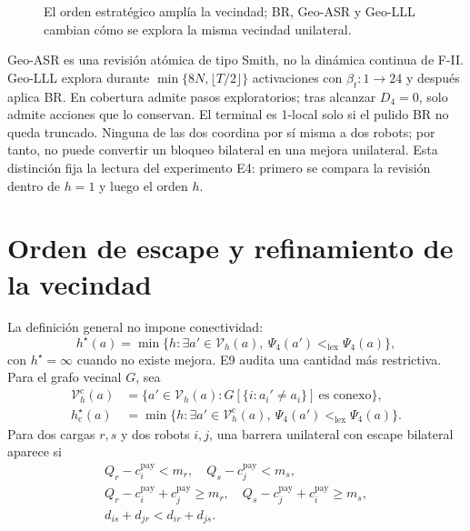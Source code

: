 \begin{figure}[H]
\centering

\caption{El orden estratégico amplía la vecindad; BR, Geo-ASR y Geo-LLL
cambian cómo se explora la misma vecindad unilateral.}
\label{fig:n4-order-revision}
\viuownsource
\end{figure}

Geo-ASR es una revisión atómica de tipo Smith, no la dinámica continua de F-II.
Geo-LLL explora durante $\min\{8N,\lfloor T/2\rfloor\}$ activaciones con
$\beta_t:1\to24$ y después aplica BR. En cobertura admite pasos exploratorios;
tras alcanzar $D_4=0$, solo admite acciones que lo conservan. El terminal es
1-local solo si el pulido BR no queda truncado. Ninguna
de las dos coordina por sí misma a dos robots; por tanto, no puede convertir un
bloqueo bilateral en una mejora unilateral. Esta distinción fija la lectura del
experimento E4: primero se compara la revisión dentro de $h=1$ y luego el orden
$h$.

\clearpage

\section*{Orden de escape y refinamiento de la vecindad}
\enlargethispage{1\baselineskip}
\begingroup
\setlength{\abovedisplayskip}{5pt}
\setlength{\belowdisplayskip}{5pt}
\setlength{\abovedisplayshortskip}{3pt}
\setlength{\belowdisplayshortskip}{3pt}

La definición general no impone conectividad:
\begin{equation}
\label{eq:n4-escape-order}
h^\star(a)=\min\{h:\exists a'\in\mathcal V_h(a),\
\Psi_4(a')<_{\mathrm{lex}}\Psi_4(a)\},
\end{equation}
con $h^\star=\infty$ cuando no existe mejora. E9 audita una cantidad más
restrictiva. Para el grafo vecinal $G$, sea
\begin{equation}
\label{eq:n4-connected-escape-order}
\begin{aligned}
\mathcal V_h^{\mathrm c}(a)&=\{a'\in\mathcal V_h(a):
G[\{i:a_i'\ne a_i\}]\ \text{es conexo}\},\\[-1mm]
h_{\mathrm c}^\star(a)&=\min\{h:\exists a'\in\mathcal V_h^{\mathrm c}(a),\
\Psi_4(a')<_{\mathrm{lex}}\Psi_4(a)\}.
\end{aligned}
\end{equation}
Para dos cargas $r,s$ y dos
robots $i,j$, una barrera unilateral con escape bilateral aparece si
\begin{equation}
\label{eq:n4-bilateral-barrier-compact}
\begin{gathered}
Q_r-c_i^{\mathrm{pay}}<m_r,\quad Q_s-c_j^{\mathrm{pay}}<m_s,\\
Q_r-c_i^{\mathrm{pay}}+c_j^{\mathrm{pay}}\ge m_r,\quad
Q_s-c_j^{\mathrm{pay}}+c_i^{\mathrm{pay}}\ge m_s,\\
d_{is}+d_{jr}<d_{ir}+d_{js}.
\end{gathered}
\end{equation}

